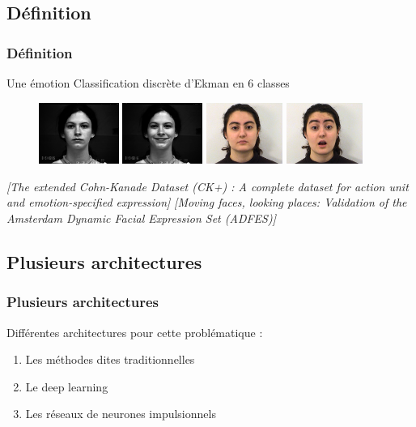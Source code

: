 \documentclass{beamer}
\newcommand{\refimg}[1]{\footnotesize\textit{#1}}
\begin{document}
\subsection{Définition}
\begin{frame}
  \frametitle{Définition}
  \begin{block}{Une émotion}
    Classification discrète d'Ekman en 6 classes
  \end{block}
  \begin{figure}
  	\includegraphics[height=2cm]{image/img_0012_ck.png}
    \includegraphics[height=2cm]{image/img_0122_ck.png}
    \includegraphics[height=2cm]{image/img_0012_adfes.png}
    \includegraphics[height=2cm]{image/img_1502_adfes.png}
  \end{figure}
  \refimg{[The extended Cohn-Kanade Dataset (CK+) : A complete dataset for action unit and emotion-specified expression]}\newline
  \refimg{[Moving faces, looking places: Validation of the Amsterdam Dynamic Facial Expression Set (ADFES)]}
\end{frame}


\subsection{Plusieurs architectures}
\begin{frame}
  \frametitle{Plusieurs architectures}
  Différentes architectures pour cette problématique :
  \begin{enumerate}
    \item Les méthodes dites traditionnelles
    \item Le deep learning
    \item Les réseaux de neurones impulsionnels
  \end{enumerate}
\end{frame}
\end{document}
